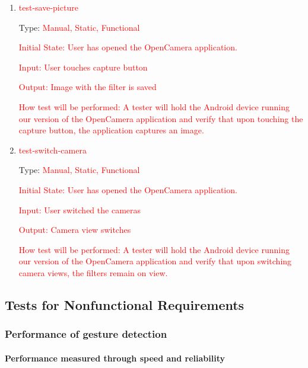 \documentclass[12pt, titlepage]{article}
\begin{document}
\begin{enumerate}

\item{\textcolor{red}{ test-save-picture}\\}

Type: \textcolor{red}{Manual, Static, Functional}
					
\textcolor{red}{Initial State: 
    User has opened the OpenCamera application.}
					
\textcolor{red}{Input: User touches capture button}
					
\textcolor{red}{Output: Image with the filter is saved}
					
\textcolor{red}{How test will be performed: A tester will hold the Android device running our version of the OpenCamera application and verify that upon touching the capture button, the application captures an image.}

\item{\textcolor{red}{ test-switch-camera}\\}

Type: \textcolor{red}{Manual, Static, Functional}
					
\textcolor{red}{Initial State: 
    User has opened the OpenCamera application.}
					
\textcolor{red}{Input: User switched the cameras}
					
\textcolor{red}{Output: Camera view switches}
					
\textcolor{red}{How test will be performed: A tester will hold the Android device running our version of the OpenCamera application and verify that upon switching camera views, the filters remain on view.}

\end{enumerate}

\subsection{Tests for Nonfunctional Requirements}

\subsubsection{Performance of gesture detection}
		
\paragraph{Performance measured through speed and reliability}
\end{document}
